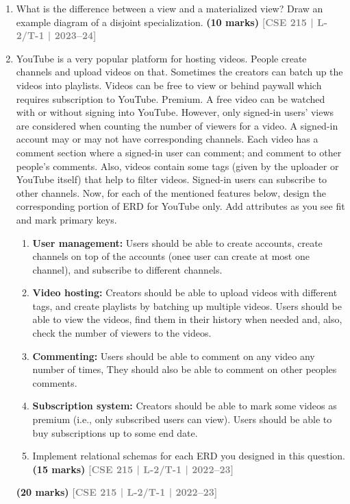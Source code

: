 \documentclass[12pt]{article}
\newcommand{\yr}[1]{\hfill\textcolor{gray}{\small\textbf{[#1]}}}
\newcommand{\mk}[1]{\textcolor{orange!70!black}{\small\textbf{(#1 marks)}}}
\begin{document}
\begin{enumerate}
\item What is the difference between a view and a materialized view? Draw an example diagram of a disjoint specialization.
\mk{10} \yr{CSE 215 | L-2/T-1 | 2023--24}


\item YouTube is a very popular platform for hosting videos. People create channels and
upload videos on that. Sometimes the creators can batch up the videos into playlists.
Videos can be free to view or behind paywall which requires subscription to YouTube.
Premium. A free video can be watched with or without signing into YouTube. However,
only signed-in users' views are considered when counting the number of viewers for a
video. A signed-in account may or may not have corresponding channels. Each video has
a comment section where a signed-in user can comment; and comment to other people’s
comments. Also, videos contain some tags (given by the uploader or YouTube itself) that
help to filter videos. Signed-in users can subscribe to other channels. Now, for each of the
mentioned features below, design the corresponding portion of ERD for YouTube only.
Add attributes as you see fit and mark primary keys.
\begin{enumerate}
  \item \textbf{User management:} Users should be able to create accounts, create channels on top of
the accounts (one¢ user can create at most one channel), and subscribe to different
channels.
  \item \textbf{Video hosting:} Creators should be able to upload videos with different tags, and
create playlists by batching up multiple videos. Users should be able to view the videos,
find them in their history when needed and, also, check the number of viewers to the
videos.
  \item \textbf{Commenting:} Users should be able to comment on any video any number of times,
They should also be able to comment on other peoples comments.
  \item \textbf{Subscription system:} Creators should be able to mark some videos as premium (i.e.,
only subscribed users can view). Users should be able to buy subscriptions up to some
end date.

\item Implement relational schemas for each ERD you designed in this question.
\mk{15} \yr{CSE 215 | L-2/T-1 | 2022--23}
\end{enumerate}
\mk{20} \yr{CSE 215 | L-2/T-1 | 2022--23}




\end{enumerate}
\end{document}
